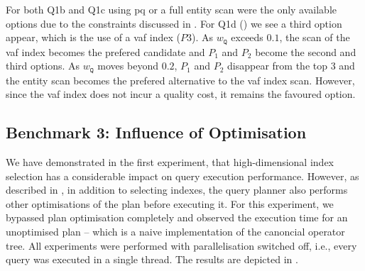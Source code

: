 For both Q1b and Q1c using \acrshort{pq} or a full entity scan were the only available options due to the constraints discussed in . For Q1d () we see a third option appear, which is the use of a \acrshort{vaf} index ($P3$). As $w_{\mathtt{Q}}$ exceeds $0.1$, the scan of the \acrshort{vaf} index becomes the prefered candidate and $P_1$ and $P_2$ become the second and third options. As $w_{\mathtt{Q}}$ moves beyond $0.2$, $P_1$ and $P_2$ disappear from the top 3 and the entity scan becomes the prefered alternative to the \acrshort{vaf} index scan. However, since the \acrshort{vaf} index does not incur a quality cost, it remains the favoured option.

\newpage

\subsection{Benchmark 3: Influence of Optimisation}
We have demonstrated in the first experiment, that high-dimensional index selection has a considerable impact on query execution performance. However, as described in , in addition to selecting indexes, the query planner also performs other optimisations of the plan before executing it. For this experiment, we bypassed plan optimisation completely and observed the execution time for an unoptimised plan -- which is a naive implementation of the canoncial operator tree. All experiments were performed with parallelisation switched off, i.e., every query was executed in a single thread. The results are depicted in .

